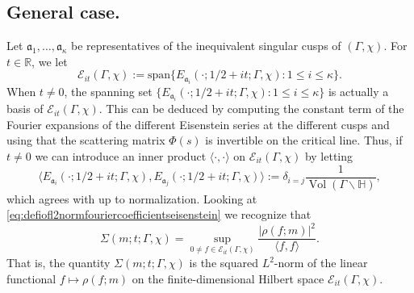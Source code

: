 \documentclass{article}
\theoremstyle{named}
\newcommand{\E}{\mathcal{E}}
\newcommand{\Hyp}{\mathbb{H}}
\newcommand{\R}{\mathbb{R}}
\renewcommand{\a}{\mathfrak{a}}
\DeclareMathOperator{\vol}{Vol}
\begin{document}
\subsection{General case.}
Let $\a_1, \ldots, \a_\kappa$ be representatives of the inequivalent singular cusps of $(\Gamma, \chi)$. For $t \in \R$, we let 
\begin{equation*}
    \E_{it}(\Gamma, \chi) := \text{span}\{E_{\a_i}(\cdot; 1/2 + it; \Gamma, \chi) : 1 \leq i \leq \kappa\}.
\end{equation*}
When $t \neq 0$, the spanning set $\{E_{\a_i}(\cdot; 1/2 + it; \Gamma, \chi): 1 \leq i \leq \kappa\}$ is actually a basis of $\E_{it}(\Gamma, \chi)$. This can be deduced by computing the constant term  of the Fourier expansions of the different Eisenstein series at the different cusps and using that the scattering matrix $\Phi(s)$ is invertible on the critical line. Thus, if $t \neq 0$ we can introduce an inner product $\langle \cdot, \cdot \rangle$ on $\E_{it}(\Gamma, \chi)$ by letting
\begin{equation}\label{eq:innerproductEisensteinseries}
    \langle E_{\a_i}(\cdot; 1/2 + it; \Gamma, \chi), E_{\a_j}(\cdot; 1/2 + it; \Gamma, \chi)\rangle := \delta_{i =  j}\frac{1}{\vol(\Gamma\backslash \Hyp)},
\end{equation}
which agrees with \cite[Equation (8.1)]{youngeisensteinseries} up to normalization. Looking at \eqref{eq:defiofl2normfouriercoefficientseisenstein} we recognize that
\begin{equation}\label{eq:continuousfouriercoefficientsasl2norm}
    \Sigma(m; t; \Gamma, \chi) = \sup_{0 \neq f \in \E_{it}(\Gamma, \chi)}\frac{|\rho(f; m)|^2}{\langle f, f \rangle }.
\end{equation}
That is, the quantity $\Sigma(m; t; \Gamma, \chi)$ is the squared $L^2$-norm of the linear functional $f \mapsto \rho(f; m)$ on the finite-dimensional Hilbert space $\E_{it}(\Gamma, \chi)$.
\end{document}
